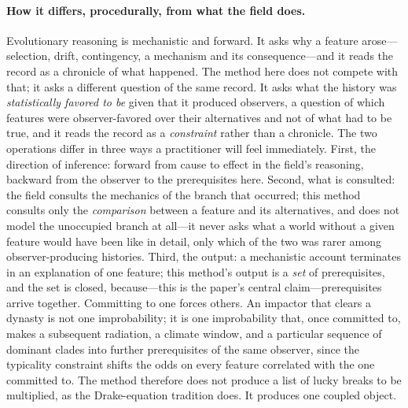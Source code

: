 \documentclass[11pt]{article}
\theoremstyle{definition}
\begin{document}
\paragraph{How it differs, procedurally, from what the field does.} Evolutionary reasoning is mechanistic and forward. It asks why a feature arose---selection, drift, contingency, a mechanism and its consequence---and it reads the record as a chronicle of what happened. The method here does not compete with that; it asks a different question of the same record. It asks what the history was \emph{statistically favored to be} given that it produced observers, a question of which features were observer-favored over their alternatives and not of what had to be true, and it reads the record as a \emph{constraint} rather than a chronicle. The two operations differ in three ways a practitioner will feel immediately. First, the direction of inference: forward from cause to effect in the field's reasoning, backward from the observer to the prerequisites here. Second, what is consulted: the field consults the mechanics of the branch that occurred; this method consults only the \emph{comparison} between a feature and its alternatives, and does not model the unoccupied branch at all---it never asks what a world without a given feature would have been like in detail, only which of the two was rarer among observer-producing histories. Third, the output: a mechanistic account terminates in an explanation of one feature; this method's output is a \emph{set} of prerequisites, and the set is closed, because---this is the paper's central claim---prerequisites arrive together. Committing to one forces others. An impactor that clears a dynasty is not one improbability; it is one improbability that, once committed to, makes a subsequent radiation, a climate window, and a particular sequence of dominant clades into further prerequisites of the same observer, since the typicality constraint shifts the odds on every feature correlated with the one committed to. The method therefore does not produce a list of lucky breaks to be multiplied, as the Drake-equation tradition does. It produces one coupled object.

\end{document}
